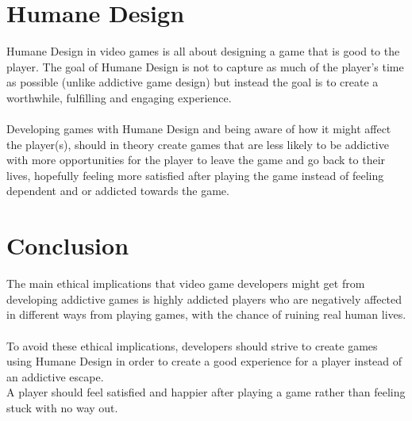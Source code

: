 \documentclass{scrartcl}
\begin{document}
\section{Humane Design}
Humane Design in video games is all about designing a game that is good to the player. The goal of Humane Design is not to capture as much of the player's time as possible (unlike addictive game design) but instead the goal is to create a worthwhile, fulfilling and engaging experience.\cite{Addiction4, HumaneDesign}
\\
\\
Developing games with Humane Design and being aware of how it might affect the player(s), should in theory create games that are less likely to be addictive with more opportunities for the player to leave the game and go back to their lives, hopefully feeling more satisfied after playing the game instead of feeling dependent and or addicted towards the game.


\section{Conclusion}
The main ethical implications that video game developers might get from developing addictive games is highly addicted players who are negatively affected in different ways from playing games, with the chance of ruining real human lives.
\\
\\
To avoid these ethical implications, developers should strive to create games using Humane Design in order to create a good experience for a player instead of an addictive escape.
\\
A player should feel satisfied and happier after playing a game rather than feeling stuck with no way out.




\end{document}
